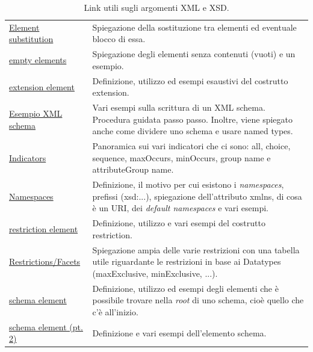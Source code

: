 \documentclass[a4paper]{article}
\begin{document}
\begin{table}[!htp]
\begin{tabular}{@{} l p{23em} @{}}
			\href{https://www.w3schools.com/XML/schema_complex_subst.asp}{Element substitution} & Spiegazione della sostituzione tra elementi ed eventuale blocco di essa. \\ [0.5em]
			
			\href{https://www.w3schools.com/XML/schema_complex_empty.asp}{empty elements} & Spiegazione degli elementi senza contenuti (vuoti) e un esempio. \\ [0.5em]
			
			\href{https://www.w3schools.com/xml/el_extension.asp}{extension element} & Definizione, utilizzo ed esempi esaustivi del costrutto \textsf{extension}. \\ [0.5em]
			
			\href{https://www.w3schools.com/XML/schema_example.asp}{Esempio XML schema} & Vari esempi sulla scrittura di un XML schema. Procedura guidata passo passo. Inoltre, viene spiegato anche come dividere uno schema e usare \textsf{named types}. \\ [0.5em]
			
			\href{https://www.w3schools.com/XML/schema_complex_indicators.asp}{Indicators} & Panoramica sui vari indicatori che ci sono: \textsf{all}, \textsf{choice}, \textsf{sequence}, \textsf{maxOccurs}, \textsf{minOccurs}, \textsf{group name} e \textsf{attributeGroup name}. \\ [0.5em]
			
			\href{https://www.w3schools.com/XML/xml_namespaces.asp}{Namespaces} & Definizione, il motivo per cui esistono i \emph{namespaces}, prefissi (\textsf{xsd:...}), spiegazione dell'attributo \textsf{xmlns}, di cosa è un URI, dei \emph{default namespaces} e vari esempi. \\ [0.5em]
			
			\href{https://www.w3schools.com/xml/el_restriction.asp}{restriction element} & Definizione, utilizzo e vari esempi del costrutto \textsf{restriction}. \\ [0.5em]
			
			\href{https://www.w3schools.com/XML/schema_facets.asp}{Restrictions/Facets} & Spiegazione ampia delle varie restrizioni con una tabella utile riguardante le restrizioni in base ai \textsf{Datatypes} (\textsf{maxExclusive}, \textsf{minExclusive}, ...). \\ [0.5em]
			
			\href{https://www.w3schools.com/xml/el_schema.asp}{schema element} & Definizione, utilizzo ed esempi degli elementi che è possibile trovare nella \emph{root} di uno schema, cioè quello che c'è all'inizio. \\ [0.5em]
			
			\href{https://www.w3schools.com/XML/schema_schema.asp}{schema element (pt. 2)} & Definizione e vari esempi dell'elemento \textsf{schema}. \\
			\midrule
		\end{tabular}
		\caption{Link utili sugli argomenti XML e XSD.}
	\end{table}
	
\end{document}
